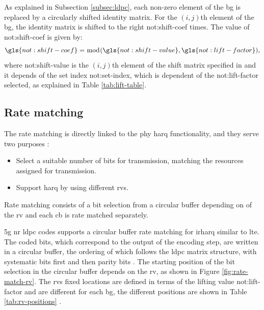 As explained in Subsection \ref{subsec:ldpc}, each non-zero element of the \gls{bg} is replaced by a circularly shifted identity matrix.
%
For the $(i,j)$th element of the \gls{bg}, the identity matrix is shifted to the right \gls{not:shift-coef} times.
%
The value of \gls{not:shift-coef} is given by:
%
\begin{equation}
    \gls{not:shift-coef} = \bmod (\gls{not:shift-value}, \gls{not:lift-factor}) ,
\end{equation}
%
\noindent where \gls{not:shift-value} is the $(i,j)$th element of the shift matrix specified in \cite[Tables 5.3.2-2 and 5.3.2-3]{3gpp.38.212} and it depends of the set index \gls{not:set-index}, which is dependent of the \gls{not:lift-factor} selected, as explained in Table \ref{tab:lift-table}.



\subsection{Rate matching}

The rate matching is directly linked to the \gls{phy} \gls{harq} functionality, and they serve two purposes \cite{ErikDahlman5G}:
%
\begin{itemize}
    \item Select a suitable number of bits for transmission, matching the resources assigned for transmission.
    \item Support \gls{harq} by using different \glspl{rv}.
\end{itemize}
%
Rate matching consists of a bit selection from a circular buffer depending on of the \gls{rv} and each \gls{cb} is rate matched separately.

\Gls{5g} \gls{nr} \gls{ldpc} codes supports a circular buffer rate matching for \gls{irharq} similar to \gls{lte}.
%
The coded bits, which correspond to the output of the encoding step, are written in a circular buffer, the ordering of which follows the \gls{ldpc} matrix structure, with systematic bits first and then parity bits \cite{Hamidi8417496}.
%
The starting position of the bit selection in the circular buffer depends on the \gls{rv}, as shown in Figure \ref{fig:rate-match-rv}.
%
The \glspl{rv} fixed locations are defined in terms of the lifting value \gls{not:lift-factor} and are different for each \gls{bg}, the different positions are shown in Table \ref{tab:rv-positions} \cite{3gpp.38.212}.
%


